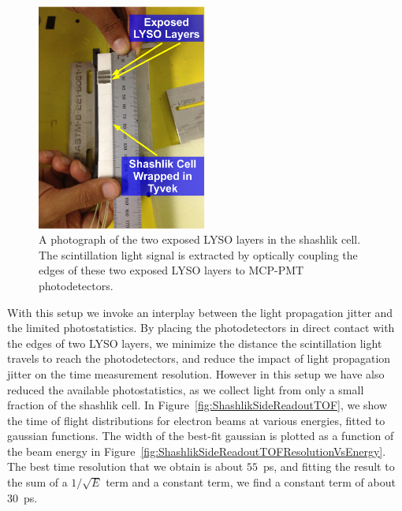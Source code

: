 \begin{figure}[H] \centering
\includegraphics[width=0.5\textwidth]{figs/timing/ShashlikSideReadoutPhotoA} 
\caption{A photograph of the two exposed LYSO layers in the shashlik cell.
The scintillation light signal is extracted by optically coupling
the edges of these two exposed LYSO layers to MCP-PMT
photodetectors. } 
\label{fig:ShashlikSideReadoutExposedLayersPhoto}
\end{figure}


With this setup we invoke an interplay between the light propagation jitter 
and the limited photostatistics. By placing the photodetectors in direct contact with the edges 
of two LYSO layers, we minimize the distance the scintillation light  travels to reach the 
photodetectors, and reduce the impact of light propagation jitter on the time measurement 
resolution. However in this setup we have also reduced the available photostatistics, as we collect 
light from only a small fraction of the shashlik cell. In Figure~\ref{fig:ShashlikSideReadoutTOF},
we show the time of flight distributions for electron beams at various energies,
fitted to gaussian functions. The width of the best-fit gaussian is plotted as a
function of the beam energy in Figure~\ref{fig:ShashlikSideReadoutTOFResolutionVsEnergy}. The 
best time resolution that we obtain is about $55$~ps, and fitting the result to the sum of
a $1/\sqrt{E}$ term and a constant term, we find a constant term of about
$30$~ps. 

